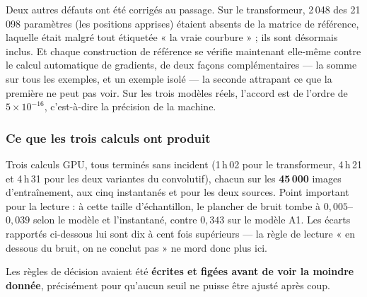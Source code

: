 \documentclass[11pt,a4paper]{article}
\begin{document}
Deux autres défauts ont été corrigés au passage. Sur le transformeur, 2\,048 des 21\,098 paramètres
(les positions apprises) étaient absents de la matrice de référence, laquelle était malgré tout
étiquetée « la vraie courbure » ; ils sont désormais inclus. Et chaque construction de référence se
vérifie maintenant elle-même contre le calcul automatique de gradients, de deux façons
complémentaires — la somme sur tous les exemples, et un exemple isolé — la seconde attrapant ce que
la première ne peut pas voir. Sur les trois modèles réels, l'accord est de l'ordre de
$5\times10^{-16}$, c'est-à-dire la précision de la machine.

\subsubsection*{Ce que les trois calculs ont produit}

Trois calculs GPU, tous terminés sans incident (1\,h\,02 pour le transformeur, 4\,h\,21 et 4\,h\,31
pour les deux variantes du convolutif), chacun sur les \textbf{45\,000} images d'entraînement, aux
cinq instantanés et pour les deux sources. Point important pour la lecture : à cette taille
d'échantillon, le plancher de bruit tombe à $0{,}005$--$0{,}039$ selon le modèle et l'instantané,
contre $0{,}343$ sur le modèle A1. Les écarts rapportés ci-dessous lui sont dix à cent fois
supérieurs — la règle de lecture « en dessous du bruit, on ne conclut pas » ne mord donc plus ici.

Les règles de décision avaient été \textbf{écrites et figées avant de voir la moindre donnée},
précisément pour qu'aucun seuil ne puisse être ajusté après coup.
\end{document}
